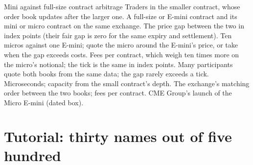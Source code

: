 \begin{strategyfile}{Mini against full-size contract arbitrage}\label{strat:hf:index-and-basket-arbitrage:mini}
 Traders in the smaller contract, whose order book updates after the larger one.
 A full-size or E-mini contract and its mini or micro contract on the same exchange.
 The price gap between the two in index points (their fair gap is zero for the same expiry and settlement).
 Ten micros against one E-mini; quote the micro around the E-mini's price, or take when the gap exceeds costs.
 Fees per contract, which weigh ten times more on the micro's notional; the tick is the same in index points.
 Many participants quote both books from the same data; the gap rarely exceeds a tick.
 Microseconds; capacity from the small contract's depth.
 The exchange's matching order between the two books; fees per contract.
 CME Group's launch of the Micro E-mini (dated box).
\end{strategyfile}

\section{Tutorial: thirty names out of five hundred}\label{tut:hf:index-and-basket-arbitrage:tut}

